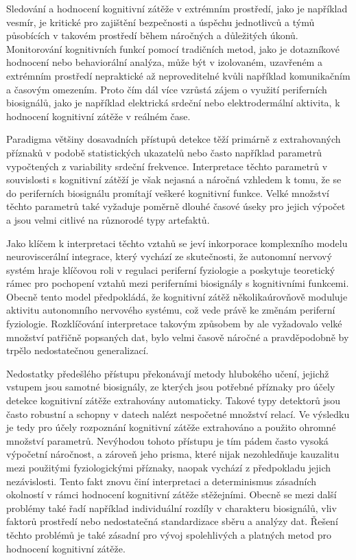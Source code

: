 Sledování a hodnocení kognitivní zátěže v extrémním prostředí, jako je například
vesmír, je kritické pro zajištění bezpečnosti a úspěchu jednotlivců a týmů
působících v takovém prostředí během náročných a důležitých úkonů. Monitorování
kognitivních funkcí pomocí tradičních metod, jako je dotazníkové hodnocení nebo
behaviorální analýza, může být v izolovaném, uzavřeném a extrémním prostředí
nepraktické až neproveditelné kvůli například komunikačním a časovým omezením.
Proto čím dál více vzrůstá zájem o využití periferních biosignálů, jako je
například elektrická srdeční nebo elektrodermální aktivita, k hodnocení
kognitivní zátěže v reálném čase. 

Paradigma většiny dosavadních přístupů detekce těží primárně z extrahovaných
příznaků v podobě statistických ukazatelů nebo často například parametrů
vypočtených z variability srdeční frekvence. Interpretace těchto parametrů v
souvislosti s kognitivní zátěží je však nejasná a náročná vzhledem k tomu, že se
do periferních biosignálu promítají veškeré kognitivní funkce. Velké množství
těchto parametrů také vyžaduje poměrně dlouhé časové úseky pro jejich výpočet a
jsou velmi citlivé na různorodé typy artefaktů.

Jako klíčem k interpretaci těchto vztahů se jeví inkorporace komplexního modelu
neuroviscerální integrace, který vychází ze skutečnosti, že autonomní nervový
systém hraje klíčovou roli v regulaci periferní fyziologie a poskytuje
teoretický rámec pro pochopení vztahů mezi periferními biosignály s kognitivními
funkcemi. Obecně tento model předpokládá, že kognitivní zátěž několikaúrovňově
moduluje aktivitu autonomního nervového systému, což vede právě ke změnám
periferní fyziologie. Rozklíčování interpretace takovým způsobem by ale
vyžadovalo velké množství patřičně popsaných dat, bylo velmi časově náročné a
pravděpodobně by trpělo nedostatečnou generalizací.

Nedostatky předešlého přístupu překonávají metody hlubokého učení, jejichž
vstupem jsou samotné biosignály, ze kterých jsou potřebné příznaky pro účely
detekce kognitivní zátěže extrahovány automaticky. Takové typy detektorů jsou
často robustní a schopny v datech nalézt nespočetné množství relací. Ve výsledku
je tedy pro účely rozpoznání kognitivní zátěže extrahováno a použito ohromné
množství parametrů. Nevýhodou tohoto přístupu je tím pádem často vysoká
výpočetní náročnost, a zároveň jeho prisma, které nijak nezohledňuje kauzalitu
mezi použitými fyziologickými příznaky, naopak vychází z předpokladu jejich
nezávislosti. Tento fakt znovu činí interpretaci a determinismus zásadních
okolností v rámci hodnocení kognitivní zátěže stěžejními. Obecně se mezi další
problémy také řadí například individuální rozdíly v charakteru biosignálů, vliv
faktorů prostředí nebo nedostatečná standardizace sběru a analýzy dat. Řešení
těchto problémů je také zásadní pro vývoj spolehlivých a platných metod pro
hodnocení kognitivní zátěže.


